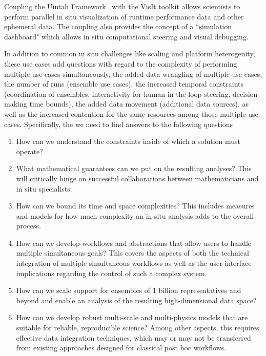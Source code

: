 \begin{refsection}
Coupling the Uintah Framework~\cite{Meng12} with the VisIt toolkit allows scientists to perform parallel in situ visualization of runtime performance data and other ephemeral data. The coupling also provides the concept of a “simulation dashboard" which allows in situ computational steering and visual debugging.

In addition to common in situ challenges like scaling and platform heterogenity, these use cases add questions with regard to the complexity of performing multiple use cases simultaneously, the added data wrangling of multiple use cases, the number of runs (ensemble use cases), the increased temporal constraints (coordination of ensembles, interactivity for human-in-the-loop steering, decision making time bounds), the added data movement (additional data sources), as well as the increased contention for the same resources among those multiple use cases.
Specifically, the we need to find answers to the following questions
\begin{enumerate}
    \item How can we understand the constraints inside of which a solution must operate? 
    \item What mathematical guarantees can we put on the resulting analyses?  This will critically hinge on successful collaborations between mathematicians and in situ specialists.
    \item How can we bound its time and space complexities? This includes measures and models for how much complexity an in situ analysis adds to the overall process.
    \item How can we develop workflows and abstractions that allow users to handle multiple simultaneous goals? This covers the aspects of both the technical integration of multiple simultaneous workflows as well as the user interface implications regarding the control of such a complex system.
    \item How can we scale support for ensembles of 1 billion representatives and beyond and enable an analysis of the resulting high-dimensional data space?
    \item How can we develop robust multi-scale and multi-physics models that are suitable for reliable, reproducible science? Among other aspects, this requires effective data integration techniques, which may or may not be transferred from existing approaches designed for classical post hoc workflows.
\end{enumerate}

\printbibliography
\end{refsection}

